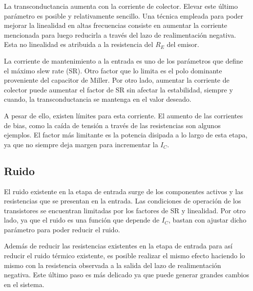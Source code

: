 La transconductancia aumenta con la corriente de colector. Elevar este último parámetro es posible y relativamente sencillo. Una técnica empleada para poder mejorar la linealidad en altas frecuencias consiste en aumentar la corriente mencionada para luego reducirla a través del lazo de realimentación negativa. Esta no linealidad es atribuida a la resistencia del $R_E$ del emisor.%

La corriente de mantenimiento a la entrada es uno de los parámetros que define el máximo slew rate (SR). Otro factor que lo limita es el polo dominante proveniente del capacitor de Miller. %
Por otro lado, aumentar la corriente de colector puede aumentar el factor de SR sin afectar la estabilidad, siempre y cuando, la transconductancia se mantenga en el valor deseado. 

A pesar de ello, existen límites para esta corriente. El aumento de las corrientes de bias, como la caída de tensión a través de las resistencias son algunos ejemplos. El factor más limitante es la potencia disipada a lo largo de esta etapa, ya que no siempre deja margen para incrementar la $I_C$. 

\subsection{Ruido}
El ruido existente en la etapa de entrada surge de los componentes activos y las resistencias que se presentan en la entrada. Las condiciones de operación de los transistores se encuentran limitadas por los factores de SR y linealidad. Por otro lado, ya que el ruido es una función que depende de $I_C$, bastan con ajustar dicho parámetro para poder reducir el ruido. 

Además de reducir las resistencias existentes en la etapa de entrada para así reducir el ruido térmico existente, es posible realizar el mismo efecto haciendo lo mismo con la resistencia observada a la salida del lazo de realimentación negativa. Este último paso es más delicado ya que puede generar grandes cambios en el sistema.


